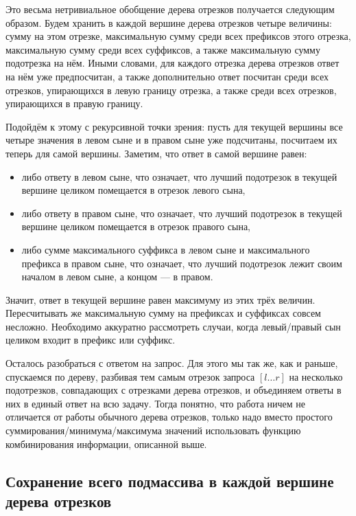 Это весьма нетривиальное обобщение дерева отрезков получается следующим образом. Будем хранить в каждой вершине дерева отрезков четыре величины: сумму на этом отрезке, максимальную сумму среди всех префиксов этого отрезка, максимальную сумму среди всех суффиксов, а также максимальную сумму подотрезка на нём. Иными словами, для каждого отрезка дерева отрезков ответ на нём уже предпосчитан, а также дополнительно ответ посчитан среди всех отрезков, упирающихся в левую границу отрезка, а также среди всех отрезков, упирающихся в правую границу.

Подойдём к этому с рекурсивной точки зрения: пусть для текущей вершины все четыре значения в левом сыне и в правом сыне уже подсчитаны, посчитаем их теперь для самой вершины. Заметим, что ответ в самой вершине равен:
\begin{itemize}
    \item либо ответу в левом сыне, что означает, что лучший подотрезок в текущей вершине целиком помещается в отрезок левого сына,
    \item либо ответу в правом сыне, что означает, что лучший подотрезок в текущей вершине целиком помещается в отрезок правого сына,
    \item либо сумме максимального суффикса в левом сыне и максимального префикса в правом сыне, что означает, что лучший подотрезок лежит своим началом в левом сыне, а концом — в правом.
\end{itemize}

Значит, ответ в текущей вершине равен максимуму из этих трёх величин. Пересчитывать же максимальную сумму на префиксах и суффиксах совсем несложно. Необходимо аккуратно рассмотреть случаи, когда левый/правый сын целиком входит в префикс или суффикс.

Осталось разобраться с ответом на запрос. Для этого мы так же, как и раньше, спускаемся по дереву, разбивая тем самым отрезок запроса $[l \ldots r]$ на несколько подотрезков, совпадающих с отрезками дерева отрезков, и объединяем ответы в них в единый ответ на всю задачу. Тогда понятно, что работа ничем не отличается от работы обычного дерева отрезков, только надо вместо простого суммирования/минимума/максимума значений использовать функцию комбинирования информации, описанной выше.

\subsection{Сохранение всего подмассива в каждой вершине дерева отрезков}

